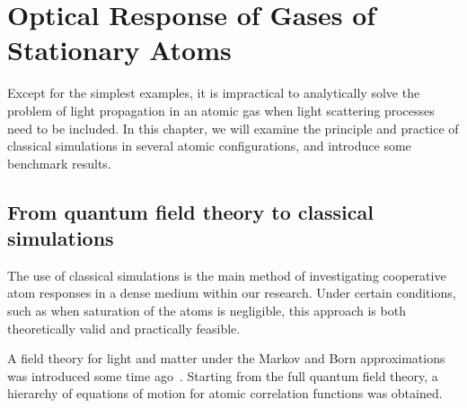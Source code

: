 \makeatletter
\newcommand{\lambdabar}{{\mathchoice
  {\smash@bar\textfont\displaystyle{0.25}{1.2}\lambda}
  {\smash@bar\textfont\textstyle{0.25}{1.2}\lambda}
  {\smash@bar\scriptfont\scriptstyle{0.25}{1.2}\lambda}
  {\smash@bar\scriptscriptfont\scriptscriptstyle{0.25}{1.2}\lambda}
}}
\newcommand{\smash@bar}[4]{%
  \smash{\rlap{\raisebox{-#3\fontdimen5#10}{$\m@th#2\mkern#4mu\mathchar'26$}}}%
}
\makeatother

\chapter{Optical Response of Gases of Stationary Atoms}

Except for the simplest examples, it is impractical to analytically solve the problem of light propagation in an atomic gas when light scattering processes need to be included. In this chapter, we will examine the principle and practice of classical simulations in several atomic configurations, and introduce some benchmark results.
 
\section{From quantum field theory to classical simulations}
\label{QFTTOCLASS}

The use of classical simulations is the main method of investigating cooperative atom responses in a dense medium within our research. Under certain conditions, such as when saturation of the atoms is negligible, this approach is both theoretically valid and practically feasible.

A field theory for light and matter under the Markov and Born approximations was introduced some time ago~\cite{PhysRevA.55.513}. Starting from the full quantum field theory, a hierarchy of equations of motion for atomic correlation functions was obtained.

